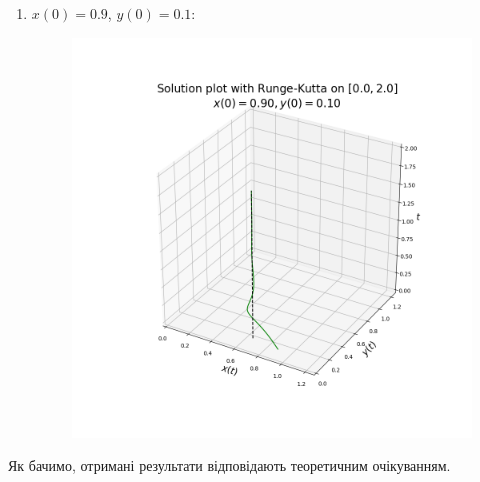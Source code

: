 \begin{enumerate}
\begin{enumerate}
\begin{figure}
		\end{figure}
		\item $x(0) = 0.9$, $y(0) = 0.1$:
		\begin{figure}
			\centering
			\includegraphics[width=\textwidth]{plot_3d_0.90_0.10_2.png}
		\end{figure}
	\end{enumerate}
\end{enumerate}

Як бачимо, отримані результати відповідають теоретичним очікуванням. \medskip

